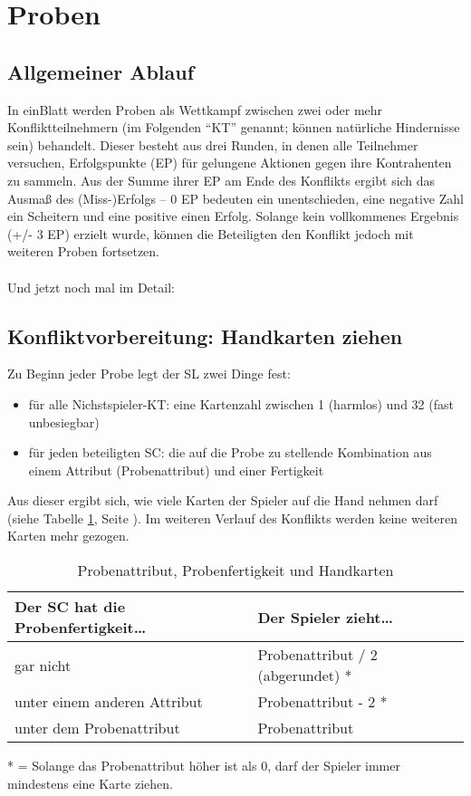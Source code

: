 \section {Proben}
\subsection {Allgemeiner Ablauf}
In einBlatt werden Proben als Wettkampf zwischen zwei oder mehr Konfliktteilnehmern (im Folgenden "`KT"' genannt; können natürliche Hindernisse sein) behandelt. Dieser besteht aus drei Runden, in denen alle Teilnehmer versuchen, Erfolgspunkte (EP) für gelungene Aktionen gegen ihre Kontrahenten zu sammeln. Aus der Summe ihrer EP am Ende des Konflikts ergibt sich das Ausmaß des (Miss-)Erfolgs -- 0 EP bedeuten ein unentschieden, eine negative Zahl ein Scheitern und eine positive einen Erfolg. Solange kein vollkommenes Ergebnis (+/- 3 EP) erzielt wurde, können die Beteiligten den Konflikt jedoch mit weiteren Proben fortsetzen.
\\
\\
Und jetzt noch mal im Detail:
\subsection {Konfliktvorbereitung: Handkarten ziehen}
Zu Beginn jeder Probe legt der SL zwei Dinge fest:
\begin{itemize}
\item für alle Nichstspieler-KT: eine Kartenzahl zwischen 1 (harmlos) und 32 (fast unbesiegbar)
\item für jeden beteiligten SC: die auf die Probe zu stellende Kombination aus einem Attribut (Probenattribut) und einer Fertigkeit
\end{itemize}
Aus dieser ergibt sich, wie viele Karten der Spieler auf die Hand nehmen darf (siehe Tabelle \ref {tab:probenattributprobenfertigkeitundhandkarten}, Seite \pageref {tab:probenattributprobenfertigkeitundhandkarten}). Im weiteren Verlauf des Konflikts werden keine weiteren Karten mehr gezogen.

\begin{table}[H]
\caption{Probenattribut, Probenfertigkeit und Handkarten}
\label{tab:probenattributprobenfertigkeitundhandkarten}
\begin{tabular}{|l|l|}
\hline
Der SC hat die Probenfertigkeit\dots & Der Spieler zieht\dots \\
\hline
gar nicht & Probenattribut / 2 (abgerundet) * \\
unter einem anderen Attribut & Probenattribut - 2 * \\
unter dem Probenattribut & Probenattribut \\
\hline
\end{tabular}

* = Solange das Probenattribut höher ist als 0, darf der Spieler immer mindestens eine Karte ziehen.
\end{table}

